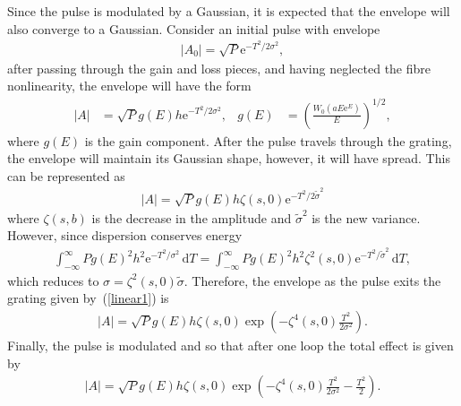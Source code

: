 \documentclass[12pt]{article}
\providecommand{\df}{\textrm{d}}
\begin{document}
Since the pulse is modulated by a Gaussian, it is expected that the envelope will also converge to a Gaussian. Consider an initial pulse with envelope
\begin{align*}
	|A_0| = \sqrt{P} \textrm{e}^{-T^2 / 2 \sigma^2},
\end{align*}
after passing through the gain and loss pieces, and having neglected the fibre nonlinearity, the envelope will have the form
\begin{align*}
	|A| &= \sqrt{P} g(E) h \textrm{e}^{-T^2 / 2 \sigma^2},&
	g(E) &= \left( \frac{W_0(a E \textrm{e}^E)}{E} \right)^{1/2},
\end{align*}
where $g(E)$ is the gain component. After the pulse travels through the grating, the envelope will maintain its Gaussian shape, however, it will have spread. This can be represented as
\begin{align}
\label{linear1}
	|A| = \sqrt{P} g(E) h \zeta(s, 0) \textrm{e}^{-T^2 / 2 \tilde{\sigma}^2}
\end{align}
where $\zeta(s, b)$ is the decrease in the amplitude and $\widetilde{\sigma}^2$ is the new variance. However, since dispersion conserves energy
\begin{align*}
	\int_{-\infty}^{\infty} P g(E)^2 h^2 \textrm{e}^{-T^2 / \sigma^2} \, \df T = 
	\int_{-\infty}^{\infty} P g(E)^2 h^2 \zeta^2(s, 0) \textrm{e}^{-T^2 / \widetilde{\sigma}^2} \, \df T,
\end{align*}
which reduces to $\sigma = \zeta^2(s, 0) \widetilde{\sigma}$. Therefore, the envelope as the pulse exits the grating given by~(\ref{linear1}) is
\begin{align*}
	|A| = \sqrt{P} g(E) h \zeta(s, 0) \exp \left( -\zeta^4(s, 0) \frac{T^2}{2 \sigma^2} \right).
\end{align*}
Finally, the pulse is modulated and so that after one loop the total effect is given by
\begin{align}
\label{linear2}
	|A| = \sqrt{P} g(E) h \zeta(s, 0) \exp \left( -\zeta^4(s, 0) \frac{T^2}{2 \sigma^2} - \frac{T^2}{2} \right).
\end{align}
\end{document}
